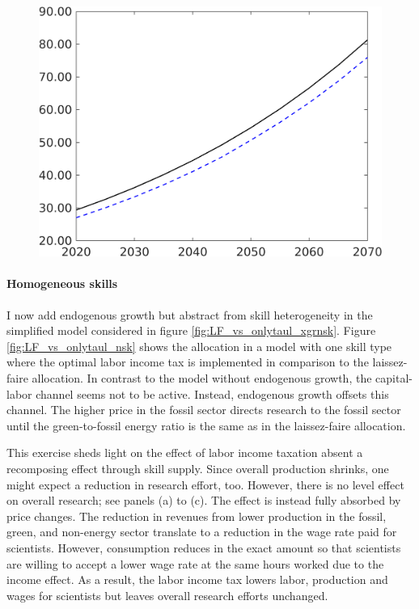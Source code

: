 \begin{figure}[h!!]
\begin{minipage}[]{0.32\textwidth}
	\end{minipage}
\begin{minipage}[]{0.32\textwidth}
	\includegraphics[width=1\textwidth]{../../codding_model/own_basedOnFried/optimalPol_190722_tidiedUp/figures/all_10Aout22/CountTaul_modxgr_target_Emnet_spillover0_sep1_extern0_PV1_etaa0.79_lgd0.png}
\end{minipage}
\end{figure} 


\paragraph{Homogeneous skills}
I now add endogenous growth but abstract from skill heterogeneity in the simplified model considered in figure \ref{fig:LF_vs_onlytaul_xgrnsk}. 
Figure \ref{fig:LF_vs_onlytaul_nsk} shows the allocation in a model with one skill type where the optimal labor income tax is implemented in comparison to the laissez-faire allocation. 
In contrast to the model without endogenous growth, the capital-labor channel seems not to be active. Instead,  endogenous growth offsets this channel. 
 The higher price in the fossil sector directs research to the fossil sector until the green-to-fossil energy ratio is the same as in the laissez-faire allocation.


This exercise sheds light on the effect of labor income taxation absent a recomposing effect through skill supply. 
Since overall production shrinks, one might expect a reduction in research effort, too.
However, there is no level effect on overall research; see panels (a) to (c). The effect is instead fully absorbed by price changes. The reduction in revenues from lower production in the fossil, green, and non-energy sector translate to a reduction in the wage rate paid for scientists. However, consumption reduces in the exact amount so that scientists are willing to accept a lower wage rate at the same hours worked due to the income effect. As a result, the labor income tax lowers labor, production and wages for scientists but leaves overall research efforts unchanged. 

